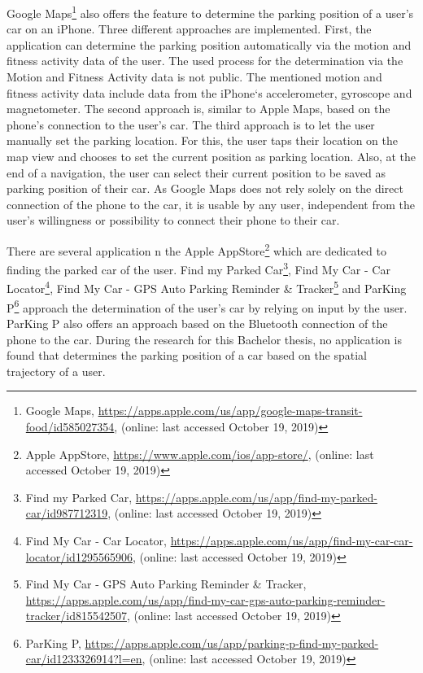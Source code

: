 Google Maps\footnote{Google Maps, \url{https://apps.apple.com/us/app/google-maps-transit-food/id585027354}, (online: last accessed October 19, 2019)} also offers the feature to determine the parking position of a user's car on an iPhone. Three different approaches are implemented. First,  the application can determine the parking position automatically via the motion and fitness activity data of the user. The used process for the determination via the Motion and Fitness Activity data is not public. The mentioned motion and fitness activity data include data from the iPhone`s accelerometer, gyroscope and magnetometer. The second approach is, similar to Apple Maps, based on the phone's connection to the user's car. The third approach is to let the user manually set the parking location. For this, the user taps their location on the map view and chooses to set the current position as parking location. Also, at the end of a navigation, the user can select their current position to be saved as parking position of their car. As Google Maps does not rely solely on the direct connection of the phone to the car, it is usable by any user, independent from the user's willingness or possibility to connect their phone to their car. \cite{google:maps:app:parkedcar}  \cite{apple:CoreMotion}

There are several application n the Apple AppStore\footnote{Apple AppStore, \url{https://www.apple.com/ios/app-store/}, (online: last accessed October 19, 2019)} which are dedicated to finding the parked car of the user. Find my Parked Car\footnote{Find my Parked Car, \url{https://apps.apple.com/us/app/find-my-parked-car/id987712319}, (online: last accessed October 19, 2019)}, Find My Car - Car Locator\footnote{Find My Car - Car Locator, \url{https://apps.apple.com/us/app/find-my-car-car-locator/id1295565906}, (online: last accessed October 19, 2019)}, Find My Car - GPS Auto Parking Reminder \& Tracker\footnote{Find My Car - GPS Auto Parking Reminder \& Tracker, \url{https://apps.apple.com/us/app/find-my-car-gps-auto-parking-reminder-tracker/id815542507}, (online: last accessed October 19, 2019)} and ParKing P\footnote{ParKing P, \url{https://apps.apple.com/us/app/parking-p-find-my-parked-car/id1233326914?l=en}, (online: last accessed October 19, 2019)} approach the determination of the user's car by relying on input by the user. ParKing P also offers an approach based on the Bluetooth connection of the phone to the car. During the research for this Bachelor thesis, no application is found that determines the parking position of a car based on the spatial trajectory of a user.

